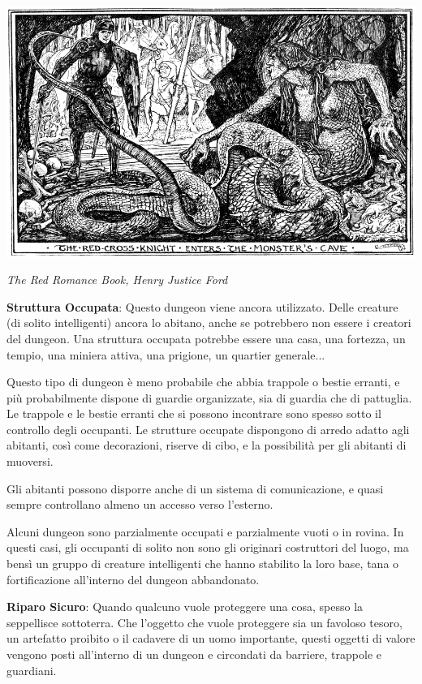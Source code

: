 \begin{multicols}{2}
\medskip
\begin{center}
\includegraphics[width=0.9\linewidth]{immagini/avventure_dungeon.png}

\emph{The Red Romance Book, Henry Justice Ford}
\end{center}
\medskip

\textbf{Struttura Occupata}: Questo dungeon viene ancora utilizzato. Delle creature (di solito intelligenti) ancora lo abitano, anche se potrebbero non essere i creatori del dungeon. Una struttura occupata potrebbe essere una casa, una fortezza, un tempio, una miniera attiva, una prigione, un quartier generale...

Questo tipo di dungeon è meno probabile che abbia trappole o bestie erranti, e più probabilmente dispone di guardie organizzate, sia di guardia che di pattuglia. Le trappole e le bestie erranti che si possono incontrare sono spesso sotto il controllo degli occupanti. Le strutture occupate dispongono di arredo adatto agli abitanti, così come decorazioni, riserve di cibo, e la possibilità per gli abitanti di muoversi.

Gli abitanti possono disporre anche di un sistema di comunicazione, e quasi sempre controllano almeno un accesso verso l'esterno.

Alcuni dungeon sono parzialmente occupati e parzialmente vuoti o in rovina. In questi casi, gli occupanti di solito non sono gli originari costruttori del luogo, ma bensì un gruppo di creature intelligenti che hanno stabilito la loro base, tana o fortificazione all'interno del dungeon abbandonato.

\textbf{Riparo Sicuro}: Quando qualcuno vuole proteggere una cosa, spesso la seppellisce sottoterra. Che l'oggetto che vuole proteggere sia un favoloso tesoro, un artefatto proibito o il cadavere di un uomo importante, questi oggetti di valore vengono posti all'interno di un dungeon e circondati da barriere, trappole e guardiani.


\end{multicols}
